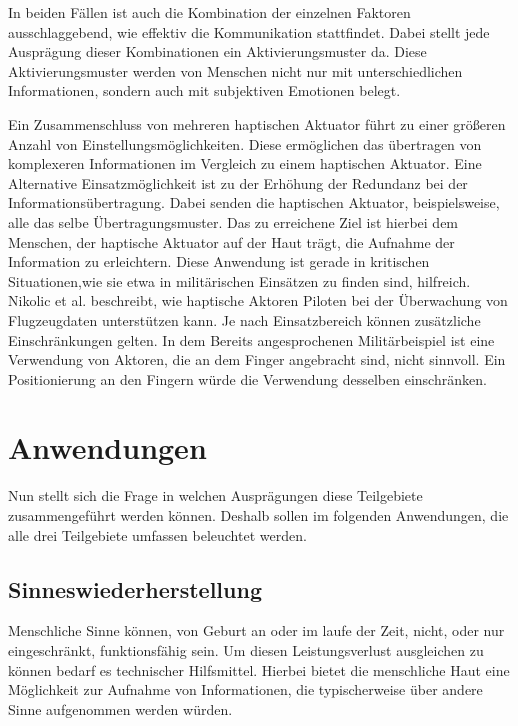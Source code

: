 \documentclass{llncs}					%
\begin{document}
In beiden Fällen ist auch die Kombination der einzelnen Faktoren ausschlaggebend, wie effektiv die Kommunikation stattfindet. Dabei stellt jede Ausprägung dieser Kombinationen ein Aktivierungsmuster da. Diese Aktivierungsmuster werden von Menschen nicht nur mit unterschiedlichen Informationen, sondern auch mit subjektiven Emotionen belegt\cite{5444662}.

Ein Zusammenschluss von mehreren haptischen Aktuator führt zu einer größeren Anzahl von Einstellungsmöglichkeiten. Diese ermöglichen das übertragen von komplexeren Informationen im Vergleich zu einem haptischen Aktuator. Eine Alternative Einsatzmöglichkeit ist zu der Erhöhung der Redundanz bei der Informationsübertragung. Dabei senden die haptischen Aktuator, beispielsweise, alle das selbe Übertragungsmuster. Das zu erreichene Ziel ist hierbei dem Menschen, der haptische Aktuator auf der Haut trägt, die Aufnahme der Information zu erleichtern. Diese Anwendung ist gerade in kritischen Situationen,wie sie etwa in militärischen Einsätzen zu finden sind, hilfreich\cite{nikolic1998multisensory}. Nikolic et al. \cite{nikolic1998multisensory} beschreibt, wie haptische Aktoren Piloten bei der Überwachung von Flugzeugdaten unterstützen kann.
Je nach Einsatzbereich können zusätzliche Einschränkungen gelten. In dem Bereits angesprochenen Militärbeispiel ist eine Verwendung von Aktoren, die an dem Finger angebracht sind, nicht sinnvoll. Ein Positionierung an den Fingern würde die Verwendung desselben einschränken.

\newpage
\section{Anwendungen}
Nun stellt sich die Frage in welchen Ausprägungen diese Teilgebiete zusammengeführt werden können. Deshalb sollen im folgenden Anwendungen, die alle drei Teilgebiete umfassen beleuchtet werden.

\subsection{Sinneswiederherstellung}
Menschliche Sinne können, von Geburt an oder im laufe der Zeit, nicht, oder nur eingeschränkt, funktionsfähig sein. Um diesen Leistungsverlust ausgleichen zu können bedarf es technischer Hilfsmittel. Hierbei bietet die menschliche Haut eine Möglichkeit zur Aufnahme von Informationen, die typischerweise über andere Sinne aufgenommen werden würden.
\end{document}
